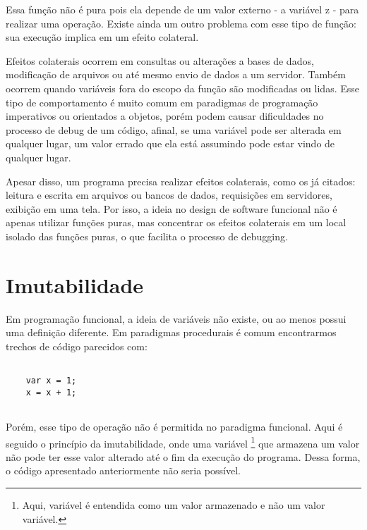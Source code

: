Essa função não é pura pois ela depende de um 
valor externo - a variável z - para realizar 
uma operação. Existe ainda um outro problema 
com esse tipo de função: sua execução implica em 
um efeito colateral.

Efeitos colaterais ocorrem em consultas ou 
alterações a bases de dados, modificação de 
arquivos ou até mesmo envio de dados a um 
servidor\cite{purefunctionscala, functionalscala}. 
Também ocorrem quando variáveis fora 
do escopo da função são modificadas ou lidas. 
Esse tipo de comportamento é muito comum em 
paradigmas de programação imperativos ou 
orientados a objetos, porém 
podem causar dificuldades no processo de 
debug de um código, afinal, se uma variável 
pode ser alterada em qualquer lugar, um 
valor errado que ela está assumindo pode 
estar vindo de qualquer lugar.

Apesar disso, um programa precisa realizar 
efeitos colaterais, como os já citados: 
leitura e escrita em arquivos ou bancos de 
dados, requisições em servidores, exibição em 
uma tela. Por isso, a ideia no design de software 
funcional não é apenas utilizar funções puras, 
mas concentrar os efeitos colaterais em um local 
isolado das funções puras, o que facilita o 
processo de debugging\cite{purefunctionscala}.



\section{Imutabilidade}

Em programação funcional, a ideia de variáveis não 
existe, ou ao menos possui uma definição diferente\cite{braveclojure}.
Em paradigmas procedurais é comum encontrarmos trechos 
de código parecidos com:

\begin{lstlisting}[caption={Exemplo de Código Mutável},label=mutablevar]

    var x = 1;
    x = x + 1;


\end{lstlisting}

Porém, esse tipo de operação não é permitida no 
paradigma funcional. Aqui é seguido o princípio 
da imutabilidade, onde uma variável \footnote{Aqui, 
variável é entendida como um valor armazenado 
e não um valor variável.} que armazena um valor 
não pode ter esse valor alterado até o fim da 
execução do programa. Dessa forma, 
o código apresentado anteriormente não seria 
possível.

